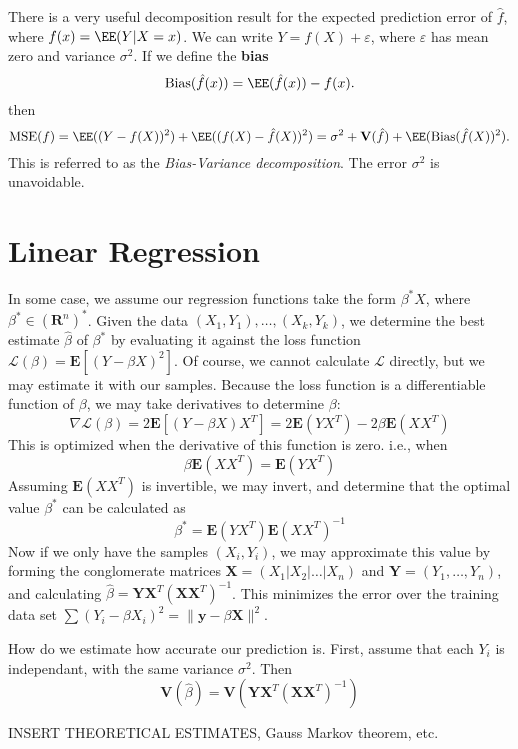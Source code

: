 There is a very useful decomposition result for the expected prediction error of $\hat{f}$, where $f(x) = \EE(Y|X=x)$. We can write $Y = f(X) + \varepsilon$, where $\varepsilon$ has mean zero and variance $\sigma^2$. If we define the {\bf bias}
%
\[ \text{Bias}(\hat{f}(x)) = \EE(\hat{f}(x)) - f(x). \]
%
then
%
\[ \text{MSE}(f) = \EE((Y - f(X))^2) + \EE((f(X) - \hat{f}(X))^2) = \sigma^2 + \mathbf{V}(\hat{f}) + \EE(\text{Bias}(\hat{f}(X))^2). \]
%
This is referred to as the {\it Bias-Variance decomposition}. The error $\sigma^2$ is unavoidable.

\section{Linear Regression}

In some case, we assume our regression functions take the form $\beta^* X$, where $\beta^* \in (\mathbf{R}^n)^*$. Given the data $(X_1, Y_1), \dots, (X_k, Y_k)$, we determine the best estimate $\hat{\beta}$ of $\beta^*$ by evaluating it against the loss function $\mathcal{L}(\beta) = \mathbf{E}[(Y - \beta X)^2]$. Of course, we cannot calculate $\mathcal{L}$ directly, but we may estimate it with our samples. Because the loss function is a differentiable function of $\beta$, we may take derivatives to determine $\beta$:
%
\[ \nabla \mathcal{L} (\beta) = 2 \mathbf{E}[(Y - \beta X)X^T] = 2 \mathbf{E}(YX^T) - 2\beta \mathbf{E}(XX^T) \]
%
This is optimized when the derivative of this function is zero. i.e., when
%
\[ \beta \mathbf{E}(XX^T) = \mathbf{E}(YX^T) \]
%
Assuming $\mathbf{E}(XX^T)$ is invertible, we may invert, and determine that the optimal value $\beta^*$ can be calculated as
%
\[ \beta^* = \mathbf{E}(YX^T) \mathbf{E}(XX^T)^{-1} \]
%
Now if we only have the samples $(X_i, Y_i)$, we may approximate this value by forming the conglomerate matrices $\mathbf{X} = (X_1 | X_2 | \dots | X_n)$ and $\mathbf{Y} = (Y_1, \dots, Y_n)$, and calculating $\hat{\beta} = \mathbf{Y} \mathbf{X}^T (\mathbf{X} \mathbf{X}^T)^{-1}$. This minimizes the error over the training data set $\sum (Y_i - \beta X_i)^2 = \|\mathbf{y} - \beta \mathbf{X}\|^2$.

How do we estimate how accurate our prediction is. First, assume that each $Y_i$ is independant, with the same variance $\sigma^2$. Then
%
\[ \mathbf{V}(\hat{\beta}) = \mathbf{V}(\mathbf{Y} \mathbf{X}^T (\mathbf{X} \mathbf{X}^T)^{-1}) \]

INSERT THEORETICAL ESTIMATES, Gauss Markov theorem, etc.





